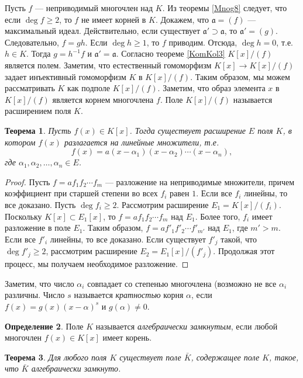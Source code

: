 \documentclass[12pt, titlepage, oneside]{amsbook}
\newcommand{\aaa}{\mathfrak{a}}
\newtheorem{theorem}{Теорема}[chapter]
\theoremstyle{definition}
\newtheorem{definition}[theorem]{Определение}
\theoremstyle{remark}
\begin{document}
Пусть $f$ --- неприводимый многочлен над $K$. Из теоремы \ref{Mnog8} следует, что если $\deg f\geq 2$, то $f$ не имеет корней в $K$. Докажем, что $\aaa=(f)$ --- максимальный идеал. Действительно, если существует $\aaa'\supset\aaa$, то $\aaa'=(g)$. Следовательно, $f=gh$. Если $\deg h\geq 1$, то $f$ приводим. Отсюда, $\deg h=0$, т.е. $h\in K$. Тогда $g=h^{-1}f$ и $\aaa'=\aaa$. Согласно теореме \ref{KomKol3} $K[x]/(f)$ является полем. Заметим, что естественный гомоморфизм $K[x]\rightarrow K[x]/(f)$ задает инъективный гомоморфизм $K$ в $K[x]/(f)$. Таким образом, мы можем рассматривать $K$ как подполе $K[x]/(f)$. Заметим, что образ элемента $x$ в $K[x]/(f)$ является корнем многочлена $f$. Поле $K[x]/(f)$ называется расширением поля $K$.

\begin{theorem}
	\label{Mnog9} Пусть $f(x)\in K[x]$. Тогда существует расширение $E$ поля $K$, в котором $f(x)$ разлагается на линейные множители, т.е. $$f(x)=a(x-\alpha_1)(x-\alpha_2)\cdots(x-\alpha_n),$$ где $\alpha_1,\alpha_2,\ldots,\alpha_n\in E$.
\end{theorem}

\begin{proof}
	Пусть $f=af_1f_2\cdots f_m$ --- разложение на неприводимые множители, причем коэффициент при старшей степени во всех $f_i$ равен $1$. Если все $f_i$ линейны, то все доказано. Пусть $\deg f_i\geq 2$. Рассмотрим расширение $E_1=K[x]/(f_i)$. Поскольку $K[x]\subset E_1[x]$, то $f=af_1f_2\cdots f_m$ над $E_1$. Более того, $f_i$ имеет разложение в поле $E_1$. Таким образом, $f=af'_1f'_2\cdots f'_{m'}$ над $E_1$, где $m'>m$. Если все $f'_i$ линейны, то все доказано. Если существует $f'_j$ такой, что $\deg f'_j\geq 2$, рассмотрим расширение $E_2=E_1[x]/(f'_j)$. Продолжая этот процесс, мы получаем необходимое разложение.
\end{proof}

Заметим, что число $\alpha_i$ совпадает со степенью многочлена (возможно не все $\alpha_i$ различны. Число $s$ называется \emph{кратностью} корня $\alpha$, если $f(x)=g(x)(x-\alpha)^s$ и $g(\alpha)\neq 0$.

\begin{definition}
	Поле $K$ называется \emph{алгебраически замкнутым}, если любой многочлен $f(x)\in K[x]$ имеет корень.
\end{definition}

\begin{theorem}
	\label{Zam}
	Для любого поля $K$ существует поле $\bar{K}$, содержащее поле $K$, такое, что $\bar{K}$ алгебраически замкнуто.
\end{theorem}
\end{document}
